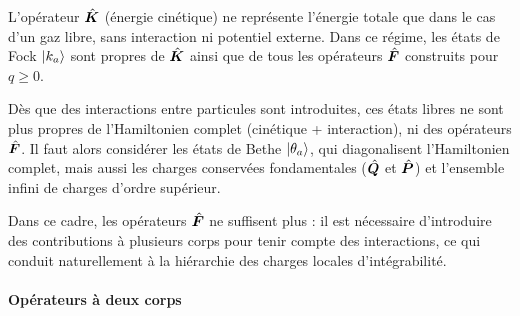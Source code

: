 {%
%
%
%
%

L’opérateur $\hat{\bm{K}}$ (énergie cinétique) ne représente l’énergie totale que dans le cas d’un gaz libre, sans interaction ni potentiel externe. Dans ce régime, les états de Fock $\ket{{k_a}}$ sont propres de $\hat{\bm{K}}$ ainsi que de tous les opérateurs $\hat{\bm{F}}$ construits pour $q \geq 0$.

\medskip

Dès que des interactions entre particules sont introduites, ces états libres ne sont plus propres de l’Hamiltonien complet (cinétique + interaction), ni des opérateurs $\hat{\bm{F}}$. Il faut alors considérer les états de Bethe $\ket{{\theta_a}}$, qui diagonalisent l’Hamiltonien complet, mais aussi les charges conservées fondamentales ($\hat{\bm{Q}}$ et $\hat{\bm{P}}$) et l’ensemble infini de charges d’ordre supérieur.

\medskip

Dans ce cadre, les opérateurs $\hat{\bm{F}}$ ne suffisent plus : il est nécessaire d’introduire des contributions à plusieurs corps pour tenir compte des interactions, ce qui conduit naturellement à la hiérarchie des charges locales d’intégrabilité.
		}



\paragraph{Opérateurs à deux corps}


